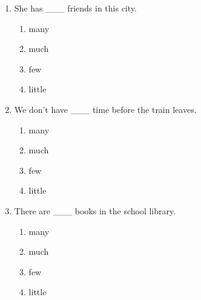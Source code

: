 \documentclass[11pt,a4paper]{ctexart}
\begin{document}
\begin{enumerate}[leftmargin=*,itemsep=4pt]
\begin{enumerate}[label=\Alph*.,leftmargin=2em,itemsep=1pt,topsep=2pt]
\item little
\end{enumerate}
\item She has \_\_\_ friends in this city.
\begin{enumerate}[label=\Alph*.,leftmargin=2em,itemsep=1pt,topsep=2pt]
\item many
\item much
\item few
\item little
\end{enumerate}
\item We don’t have \_\_\_ time before the train leaves.
\begin{enumerate}[label=\Alph*.,leftmargin=2em,itemsep=1pt,topsep=2pt]
\item many
\item much
\item few
\item little
\end{enumerate}
\item There are \_\_\_ books in the school library.
\begin{enumerate}[label=\Alph*.,leftmargin=2em,itemsep=1pt,topsep=2pt]
\item many
\item much
\item few
\item little
\end{enumerate}
\end{enumerate}
\end{document}

